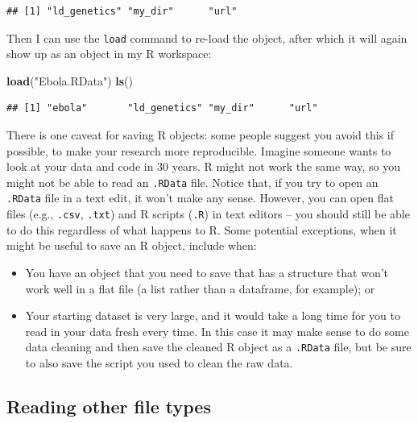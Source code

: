 \documentclass[]{book}
\makeatletter
\newenvironment{Shaded}{\begin{snugshade}}{\end{snugshade}}
\newcommand{\KeywordTok}[1]{\textcolor[rgb]{0.13,0.29,0.53}{\textbf{#1}}}
\newcommand{\StringTok}[1]{\textcolor[rgb]{0.31,0.60,0.02}{#1}}
\newcommand{\NormalTok}[1]{#1}
\providecommand{\tightlist}{%
  \setlength{\itemsep}{0pt}\setlength{\parskip}{0pt}}
\newenvironment{kframe}{%
\medskip{}
\setlength{\fboxsep}{.8em}
 \def\at@end@of@kframe{}%
 \ifinner\ifhmode%
  \def\at@end@of@kframe{\end{minipage}}%
  \begin{minipage}{\columnwidth}%
 \fi\fi%
 \def\FrameCommand##1{\hskip\@totalleftmargin \hskip-\fboxsep
 \colorbox{shadecolor}{##1}\hskip-\fboxsep
     \hskip-\linewidth \hskip-\@totalleftmargin \hskip\columnwidth}%
 \MakeFramed {\advance\hsize-\width
   \@totalleftmargin\z@ \linewidth\hsize
   \@setminipage}}%
 {\par\unskip\endMakeFramed%
 \at@end@of@kframe}
\renewenvironment{Shaded}{\begin{kframe}}{\end{kframe}}
\theoremstyle{definition}
\theoremstyle{definition}
\theoremstyle{definition}
\theoremstyle{remark}
\makeatother
\begin{document}
\begin{verbatim}
## [1] "ld_genetics" "my_dir"      "url"
\end{verbatim}

Then I can use the \texttt{load} command to re-load the object, after
which it will again show up as an object in my R workspace:

\begin{Shaded}
\begin{Highlighting}[]
\KeywordTok{load}\NormalTok{(}\StringTok{"Ebola.RData"}\NormalTok{)}
\KeywordTok{ls}\NormalTok{()}
\end{Highlighting}
\end{Shaded}

\begin{verbatim}
## [1] "ebola"       "ld_genetics" "my_dir"      "url"
\end{verbatim}

There is one caveat for saving R objects: some people suggest you avoid
this if possible, to make your research more reproducible. Imagine
someone wants to look at your data and code in 30 years. R might not
work the same way, so you might not be able to read an \texttt{.RData}
file. Notice that, if you try to open an \texttt{.RData} file in a text
edit, it won't make any sense. However, you can open flat files (e.g.,
\texttt{.csv}, \texttt{.txt}) and R scripts (\texttt{.R}) in text
editors -- you should still be able to do this regardless of what
happens to R. Some potential exceptions, when it might be useful to save
an R object, include when:

\begin{itemize}
\tightlist
\item
  You have an object that you need to save that has a structure that
  won't work well in a flat file (a list rather than a dataframe, for
  example); or
\item
  Your starting dataset is very large, and it would take a long time for
  you to read in your data fresh every time. In this case it may make
  sense to do some data cleaning and then save the cleaned R object as a
  \texttt{.RData} file, but be sure to also save the script you used to
  clean the raw data.
\end{itemize}

\subsection{Reading other file types}\label{reading-other-file-types}
\end{document}
